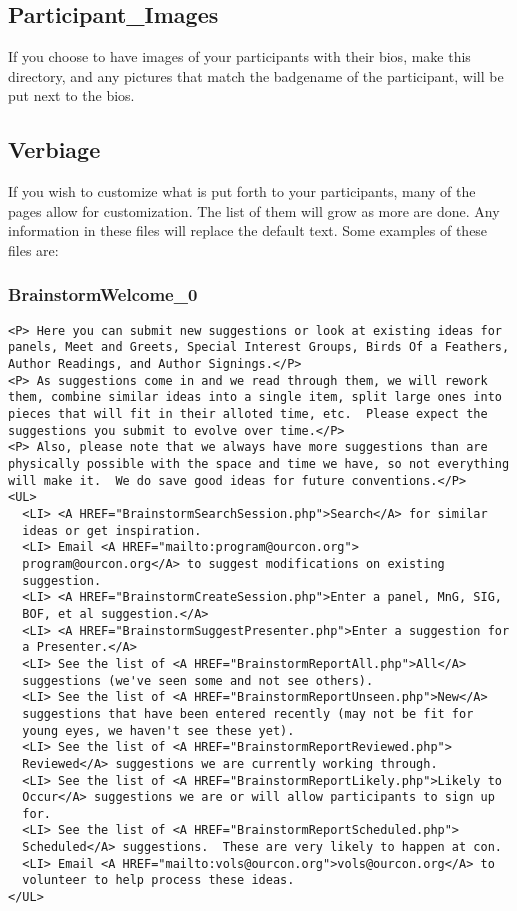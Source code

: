 \documentclass[tablesignature]{scrartcl}
\begin{document}
\subsection{Participant\_{}Images}
\label{sec-3_4}

     If you choose to have images of your participants with their
     bios, make this directory, and any pictures that match the
     badgename of the participant, will be put next to the bios.
\subsection{Verbiage}
\label{sec-3_5}

     If you wish to customize what is put forth to your participants,
     many of the pages allow for customization.  The list of them will
     grow as more are done.  Any information in these files will
     replace the default text.  Some examples of these files are:
\subsubsection{BrainstormWelcome\_{}0}
\label{sec-3_5_1}

\begin{verbatim}
<P> Here you can submit new suggestions or look at existing ideas for
panels, Meet and Greets, Special Interest Groups, Birds Of a Feathers,
Author Readings, and Author Signings.</P>
<P> As suggestions come in and we read through them, we will rework
them, combine similar ideas into a single item, split large ones into
pieces that will fit in their alloted time, etc.  Please expect the
suggestions you submit to evolve over time.</P>
<P> Also, please note that we always have more suggestions than are
physically possible with the space and time we have, so not everything
will make it.  We do save good ideas for future conventions.</P>
<UL> 
  <LI> <A HREF="BrainstormSearchSession.php">Search</A> for similar
  ideas or get inspiration.
  <LI> Email <A HREF="mailto:program@ourcon.org">
  program@ourcon.org</A> to suggest modifications on existing
  suggestion.
  <LI> <A HREF="BrainstormCreateSession.php">Enter a panel, MnG, SIG,
  BOF, et al suggestion.</A>
  <LI> <A HREF="BrainstormSuggestPresenter.php">Enter a suggestion for
  a Presenter.</A>
  <LI> See the list of <A HREF="BrainstormReportAll.php">All</A>
  suggestions (we've seen some and not see others).
  <LI> See the list of <A HREF="BrainstormReportUnseen.php">New</A>
  suggestions that have been entered recently (may not be fit for
  young eyes, we haven't see these yet).
  <LI> See the list of <A HREF="BrainstormReportReviewed.php">
  Reviewed</A> suggestions we are currently working through.
  <LI> See the list of <A HREF="BrainstormReportLikely.php">Likely to
  Occur</A> suggestions we are or will allow participants to sign up
  for.
  <LI> See the list of <A HREF="BrainstormReportScheduled.php">
  Scheduled</A> suggestions.  These are very likely to happen at con.
  <LI> Email <A HREF="mailto:vols@ourcon.org">vols@ourcon.org</A> to
  volunteer to help process these ideas.
</UL>
\end{verbatim}
\end{document}
